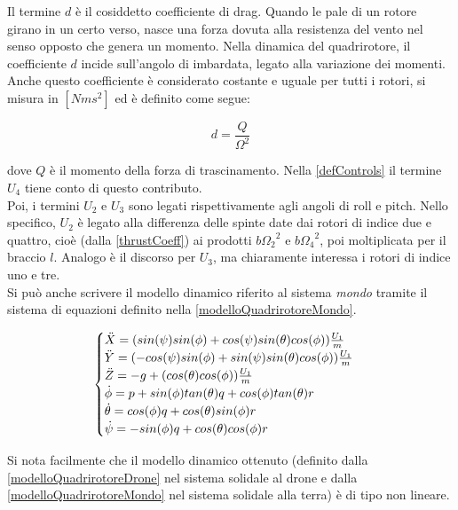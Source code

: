Il termine $d$ è il cosiddetto coefficiente di drag. Quando le pale di un rotore girano in un certo verso, nasce una forza dovuta alla resistenza del vento nel senso opposto che genera un momento. Nella dinamica del quadrirotore, il coefficiente $d$ incide sull'angolo di imbardata, legato alla variazione dei momenti. Anche questo coefficiente è considerato costante e uguale per tutti i rotori, si misura in $[N m s^2]$ ed è definito come segue:

\begin{equation}
	d = \frac{Q}{\Omega^2}
\end{equation}

dove $Q$ è il momento della forza di trascinamento. Nella \ref{defControls} il termine $U_4$ tiene conto di questo contributo.\\

Poi, i termini $U_2$ e $U_3$ sono legati rispettivamente agli angoli di roll e pitch. Nello specifico, $U_2$ è legato alla differenza delle spinte date dai rotori di indice due e quattro, cioè (dalla \ref{thrustCoeff}) ai prodotti $b{\Omega_2}^2$ e $b{\Omega_4}^2$, poi moltiplicata per il braccio $l$. Analogo è il discorso per $U_3$, ma chiaramente interessa i rotori di indice uno e tre.\\

Si può anche scrivere il modello dinamico riferito al sistema \emph{mondo} tramite il sistema di equazioni definito nella \ref{modelloQuadrirotoreMondo}.

\begin{equation}
	\begin{cases}
	\Ddot{X} = (sin(\psi)sin(\phi) + cos(\psi)sin(\theta)cos(\phi))\frac{U_1}{m} \\
	\Ddot{Y} = (-cos(\psi)sin(\phi) + sin(\psi)sin(\theta)cos(\phi))\frac{U_1}{m} \\
	\Ddot{Z} = -g + (cos(\theta)cos(\phi))\frac{U_1}{m} \\
	\Dot{\phi} = p + sin(\phi)tan(\theta)q + cos(\phi)tan(\theta)r \\
	\Dot{\theta} = cos(\phi)q + cos(\theta)sin(\phi)r \\
	\Dot{\psi} = -sin(\phi)q + cos(\theta)cos(\phi)r
	\end{cases}
	\label{modelloQuadrirotoreMondo}
\end{equation}

Si nota facilmente che il modello dinamico ottenuto (definito dalla \ref{modelloQuadrirotoreDrone} nel sistema solidale al drone e dalla \ref{modelloQuadrirotoreMondo} nel sistema solidale alla terra) è di tipo non lineare.

